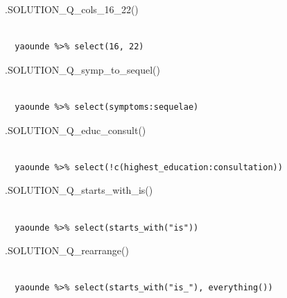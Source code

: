 \documentclass[
  letterpaper,
  DIV=11,
  numbers=noendperiod]{scrreprt}
\newenvironment{Shaded}{\begin{snugshade}}{\end{snugshade}}
\newcommand{\FunctionTok}[1]{\textcolor[rgb]{0.28,0.35,0.67}{#1}}
\newcommand{\NormalTok}[1]{\textcolor[rgb]{0.00,0.23,0.31}{#1}}
\begin{document}
\begin{Shaded}
\begin{Highlighting}[]
\FunctionTok{.SOLUTION\_Q\_cols\_16\_22}\NormalTok{()}
\end{Highlighting}
\end{Shaded}

\begin{verbatim}
 
  yaounde %>% select(16, 22)
\end{verbatim}

\begin{Shaded}
\begin{Highlighting}[]
\FunctionTok{.SOLUTION\_Q\_symp\_to\_sequel}\NormalTok{()}
\end{Highlighting}
\end{Shaded}

\begin{verbatim}
 
  yaounde %>% select(symptoms:sequelae)
\end{verbatim}

\begin{Shaded}
\begin{Highlighting}[]
\FunctionTok{.SOLUTION\_Q\_educ\_consult}\NormalTok{()}
\end{Highlighting}
\end{Shaded}

\begin{verbatim}
 
  yaounde %>% select(!c(highest_education:consultation))
\end{verbatim}

\begin{Shaded}
\begin{Highlighting}[]
\FunctionTok{.SOLUTION\_Q\_starts\_with\_is}\NormalTok{()}
\end{Highlighting}
\end{Shaded}

\begin{verbatim}
 
  yaounde %>% select(starts_with("is"))
\end{verbatim}

\begin{Shaded}
\begin{Highlighting}[]
\FunctionTok{.SOLUTION\_Q\_rearrange}\NormalTok{()}
\end{Highlighting}
\end{Shaded}

\begin{verbatim}
 
  yaounde %>% select(starts_with("is_"), everything())
\end{verbatim}
\end{document}
